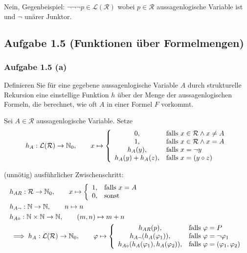 \begin{lösung}
	Nein, Gegenbeispiel: $\neg\neg\neg p\in\mathcal{L}(\mathcal{R})$ wobei $p\in\mathcal{R}$ aussagenlogische Variable ist und $\neg$ unärer Junktor.
\end{lösung}

\subsection{Aufgabe 1.5 (Funktionen über Formelmengen)}
\subsubsection{Aufgabe 1.5 (a)}
Definieren Sie für eine gegebene aussagenlogische Variable $A$ durch strukturelle Rekursion eine einstellige Funktion $h$ über der Menge der aussagenlogischen Formeln,
die berechnet, wie oft $A$ in einer Formel $F$ vorkommt.

\begin{lösung}
	Sei $A\in\mathcal{R}$ aussagenlogische Variable. Setze
	\begin{align*}
		h_A:\mathcal{L}(\mathcal{R})\to\mathbb{N}_0,\qquad x\mapsto \left\lbrace\begin{array}{cl}
			0, & \text{falls } x\in\mathcal{R}\wedge x\neq A\\
			1, & \text{falls } x\in\mathcal{R}\wedge x=A\\
			h_A(y), & \text{falls } x=\neg y\\
			h_A(y)+h_A(z), & \text{falls } x=(y\circ z)
		\end{array}\right.
	\end{align*}
	
	(unnötig) ausführlicher Zwischenschritt:
	\begin{align*}
		&h_{AR}:\mathcal{R}\to\mathbb{N}_0,\qquad x\mapsto \left\lbrace\begin{array}{cl}
			1, & \text{falls } x= A\\
			0, & \text{sonst }
		\end{array}\right.\\
		&h_{A\neg}:\mathbb{N}\to\mathbb{N},\qquad n\mapsto n\\
		&h_{A\circ}:\mathbb{N}\times\mathbb{N}\to\mathbb{N},\qquad(m,n)\mapsto m+n\\
		&\implies h_A:\mathcal{L}(\mathcal{R})\to\mathbb{N}_0,\qquad\varphi\mapsto
		\left\lbrace\begin{array}{cl}
			h_{AR}(p), & \text{falls } \varphi=P\\
			h_{A\neg}(h_A(\varphi_1)), & \text{falls } \varphi=\neg\varphi_1\\
			h_{A\circ}(h_A(\varphi_1),h_A(\varphi_2)), &\text{falls } \varphi=(\varphi_1,\varphi_2)
		\end{array}\right.
	\end{align*}
\end{lösung}

